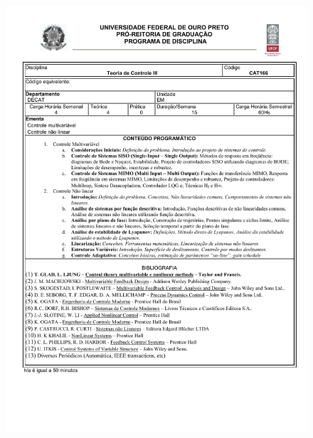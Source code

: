 \begin{figure}[p]
	\centering 
	\includegraphics[scale=0.7]{capitulos/anexo1-programas-disciplina/p73.pdf}
\end{figure}


